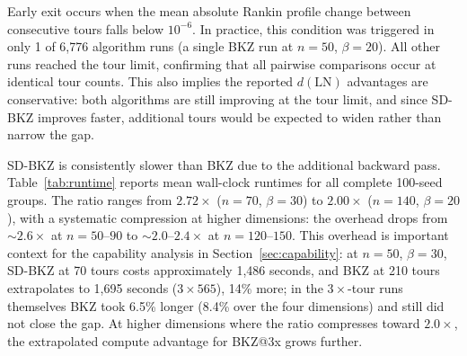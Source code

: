 \documentclass[journal=cic,version=preprint]{iacrj}
\begin{document}
Early exit occurs when the mean absolute Rankin profile change between consecutive tours falls below $10^{-6}$. In practice, this condition was triggered in only 1 of 6{,}776 algorithm runs (a single BKZ run at $n=50$, $\beta=20$). All other runs reached the tour limit, confirming that all pairwise comparisons occur at identical tour counts. This also implies the reported $d(\mathrm{LN})$ advantages are conservative: both algorithms are still improving at the tour limit, and since SD-BKZ improves faster, additional tours would be expected to widen rather than narrow the gap.

SD-BKZ is consistently slower than BKZ due to the additional backward pass. Table~\ref{tab:runtime} reports mean wall-clock runtimes for all complete 100-seed groups. The ratio ranges from $2.72\times$ ($n=70$, $\beta=30$) to $2.00\times$ ($n=140$, $\beta=20$), with a systematic compression at higher dimensions: the overhead drops from ${\sim}2.6\times$ at $n=50$--$90$ to ${\sim}2.0$--$2.4\times$ at $n=120$--$150$. This overhead is important context for the capability analysis in Section~\ref{sec:capability}: at $n=50$, $\beta=30$, SD-BKZ at 70 tours costs approximately 1{,}486 seconds, and BKZ at 210 tours extrapolates to 1{,}695 seconds ($3\times 565$), 14\% more; in the $3\times$-tour runs themselves BKZ took 6.5\% longer (8.4\% over the four dimensions) and still did not close the gap. At higher dimensions where the ratio compresses toward $2.0\times$, the extrapolated compute advantage for BKZ@3x grows further.
\end{document}
